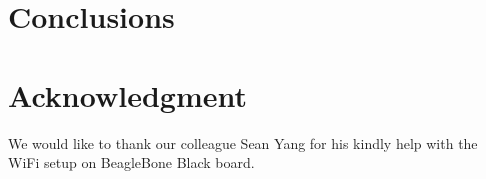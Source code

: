 \documentclass[12pt,journal,draftclsnofoot,onecolumn]{IEEEtran}
\begin{document}
	
\section{Conclusions}\label{Con}

\section*{Acknowledgment}
We would like to thank our colleague Sean Yang  for his kindly help with the WiFi setup on BeagleBone Black board.



\end{document}
